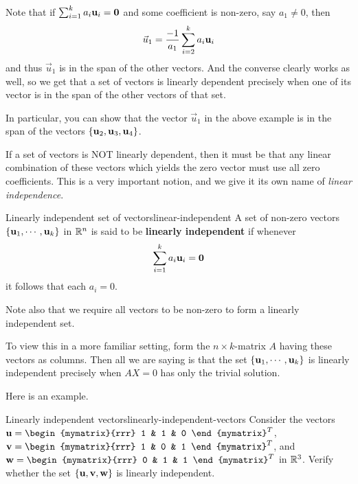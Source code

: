 Note that if $\sum_{i=1}^{k}a_{i}\mbox{\bf u}_{i}=\mbox{\bf 0}$ and some
coefficient is non-zero, say $a_1 \neq 0$, then 
\begin{equation*}
\vec{u}_1 = \frac{-1}{a_1} \sum_{i=2}^{k}a_{i}\mbox{\bf u}_{i} 
\end{equation*}
and thus $\vec{u}_1$ is in the span of the other vectors. And the converse clearly works as well,
so we get that a set of vectors is linearly dependent precisely when
one of its vector is in the span of the other vectors of that set.

In particular, you can show that the vector $\vec{u}_1$ in the above
example is in the span of the vectors  $\left\{\mbox{\bf u}_2, \mbox{\bf u}_3, \mbox{\bf u}_4\right\}$. 

If a set of vectors is NOT linearly dependent, then it must be that
any linear combination of these vectors which yields the zero vector
must use all zero coefficients. This is a very important notion, and we give it its own name of {\em
linear independence}. 

\begin{definition}{Linearly independent set of vectors}{linear-independent}
A set of non-zero vectors $\left\{\mbox{\bf u}_1, \cdots ,\mbox{\bf u}_k\right\}$ in $\mathbb{R}^{n}$ is said to be 
\textbf{linearly independent} if whenever 
\begin{equation*}
\sum_{i=1}^{k}a_{i}\mbox{\bf u}_{i}=\mbox{\bf 0}
\end{equation*}
it follows that each $a_{i}=0$.
\end{definition}


Note also that we require all vectors to be non-zero to form a
linearly independent set.

To view this in a more familiar setting, form the $n \times k$-matrix
$A$ having these vectors as columns. Then all we are saying is that
the set $\left\{\mbox{\bf u}_1, \cdots ,\mbox{\bf u}_k\right\}$ is linearly independent
precisely when $AX=0$ has only the trivial solution.

Here is an example.  

\begin{example}{Linearly independent vectors}{linearly-independent-vectors}
Consider the vectors $\vect{u}=\begin{mymatrix}{rrr}
1  & 1 & 0
\end{mymatrix}^T$, 
$\vect{v}=\begin{mymatrix}{rrr}
1  & 0 & 1
\end{mymatrix}^T$, and
$\vect{w}=\begin{mymatrix}{rrr}
0  & 1 & 1
\end{mymatrix}^T$ in $\mathbb{R}^{3}$.
Verify whether the set $\left\{\mbox{\bf u}, \mbox{\bf v}, \mbox{\bf w}\right\}$ is linearly independent. 
\end{example}

